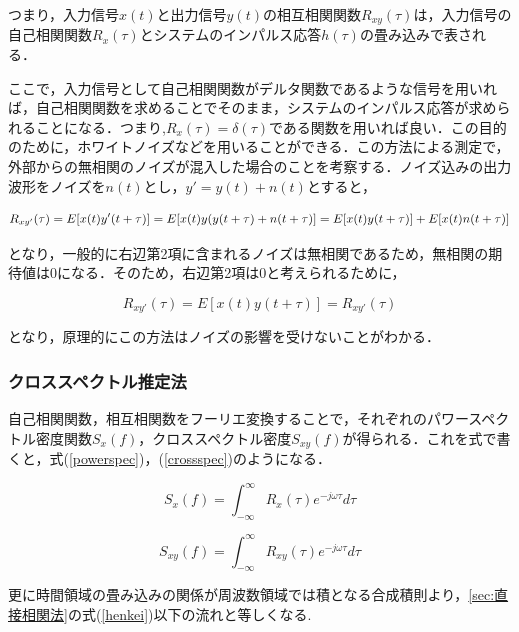 \documentclass[a4j,11pt]{jsarticle}
\begin{document}
つまり，入力信号$x(t)$と出力信号$y(t)$の相互相関関数$R_{xy}(\tau)$は，入力信号の自己相関関数$R_x(\tau)$とシステムのインパルス応答$h(\tau)$の畳み込みで表される．

ここで，入力信号として自己相関関数がデルタ関数であるような信号を用いれば，自己相関関数を求めることでそのまま，システムのインパルス応答が求められることになる．つまり,$R_x(\tau)=\delta(\tau)$である関数を用いれば良い．この目的のために，ホワイトノイズなどを用いることができる．この方法による測定で，外部からの無相関のノイズが混入した場合のことを考察する．ノイズ込みの出力波形をノイズを$n(t)$とし，$y'=y(t)+n(t)$とすると，

{\Large
\begin{dmath}
\label{henkei2}
   R_{xy'}(\tau) =E[x(t)y'(t+\tau)]=E[x(t)y{(y(t+\tau)+n(t+\tau)}] \\
   =E[x(t)y(t+\tau)]+E[x(t)n(t+\tau)]
\end{dmath}
}

となり，一般的に右辺第2項に含まれるノイズは無相関であるため，無相関の期待値は0になる．そのため，右辺第2項は0と考えられるために，

{\Large
\begin{equation}
\label{ketsuron}
   R_{xy'}(\tau) =E[x(t)y(t+\tau)]=R_{xy'}(\tau)
\end{equation}
}

となり，原理的にこの方法はノイズの影響を受けないことがわかる．

\subsubsection{クロススペクトル推定法}
\label{sec:クロススペクトル推定法}
自己相関関数，相互相関数をフーリエ変換することで，それぞれのパワースペクトル密度関数$S_x(f)$，クロススペクトル密度$S_{xy}(f)$が得られる．これを式で書くと，式(\ref{powerspec})，(\ref{crossspec})のようになる．

{\Large
\begin{equation}
\label{powerspec}
  S_x(f) = \int^{\infty}_{-\infty} R_x(\tau)e^{-j\omega \tau}{d\tau}
\end{equation}
}

{\Large
\begin{equation}
\label{crossspec}
  S_{xy}(f) = \int^{\infty}_{-\infty} R_{xy}(\tau)e^{-j\omega \tau}{d\tau}
\end{equation}
}

更に時間領域の畳み込みの関係が周波数領域では積となる合成積則より，\ref{sec:直接相関法}の式(\ref{henkei})以下の流れと等しくなる.
\end{document}

